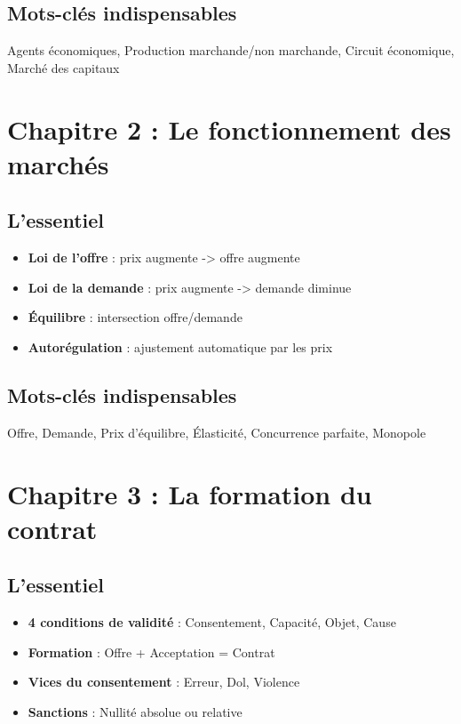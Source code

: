 \documentclass[12pt,a4paper]{article}
\begin{document}
\subsection{Mots-clés indispensables}
Agents économiques, Production marchande/non marchande, Circuit économique, Marché des capitaux

\section{Chapitre 2 : Le fonctionnement des marchés}

\subsection{L'essentiel}
\begin{itemize}
    \item \textbf{Loi de l'offre} : prix augmente -> offre augmente
    \item \textbf{Loi de la demande} : prix augmente -> demande diminue
    \item \textbf{Équilibre} : intersection offre/demande
    \item \textbf{Autorégulation} : ajustement automatique par les prix
\end{itemize}

\subsection{Mots-clés indispensables}
Offre, Demande, Prix d'équilibre, Élasticité, Concurrence parfaite, Monopole

\section{Chapitre 3 : La formation du contrat}

\subsection{L'essentiel}
\begin{itemize}
    \item \textbf{4 conditions de validité} : Consentement, Capacité, Objet, Cause
    \item \textbf{Formation} : Offre + Acceptation = Contrat
    \item \textbf{Vices du consentement} : Erreur, Dol, Violence
    \item \textbf{Sanctions} : Nullité absolue ou relative
\end{itemize}
\end{document}
